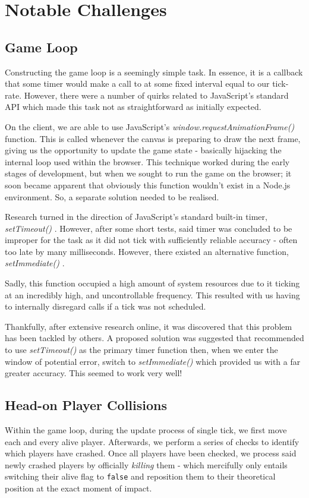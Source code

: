 \documentclass{standalone}
\begin{document}
	\section{Notable Challenges}
		\subsection{Game Loop} \label{sec:gameloopChallenges}
			Constructing the game loop is a seemingly simple task. In essence, it is a callback that some timer would make a call to at some fixed interval equal to our tick-rate. However, there were a number of quirks related to JavaScript's standard API which made this task not as straightforward as initially expected.

			On the client, we are able to use JavaScript's \emph{window.requestAnimationFrame()} \parencite{JsRequestAnimationFrame} function. This is called whenever the canvas is preparing to draw the next frame, giving us the opportunity to update the game state - basically hijacking the internal loop used within the browser. This technique worked during the early stages of development, but when we sought to run the game on the browser; it soon became apparent that obviously this function wouldn't exist in a Node.js environment. So, a separate solution needed to be realised.

			Research turned in the direction of JavaScript's standard built-in timer, \emph{setTimeout()} \parencite{JsSetTimeout}. However, after some short tests, said timer was concluded to be improper for the task as it did not tick with sufficiently reliable accuracy - often too late by many milliseconds. However, there existed an alternative function, \emph{setImmediate()} \parencite{JsSetImmediate}. 

			Sadly, this function occupied a high amount of system resources due to it ticking at an incredibly high, and uncontrollable frequency. This resulted with us having to internally disregard calls if a tick was not scheduled.

			Thankfully, after extensive research online, it was discovered that this problem has been tackled by others. A proposed solution\parencite{JsGameLoop} was suggested that recommended to use \emph{setTimeout()} as the primary timer function then, when we enter the window of potential error, switch to \emph{setImmediate()} which provided us with a far greater accuracy. This seemed to work very well!

		\subsection{Head-on Player Collisions}
			Within the game loop, during the update process of single tick, we first move each and every alive player. Afterwards, we perform a series of checks to identify which players have crashed. Once all players have been checked, we process said newly crashed players by officially \emph{killing} them - which mercifully only entails switching their alive flag to \texttt{false} and reposition them to their theoretical position at the exact moment of impact.
\end{document}
